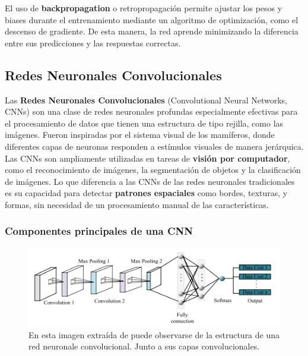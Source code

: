 El uso de \textbf{backpropagation} o retropropagación permite ajustar los pesos y biases durante el entrenamiento
mediante un algoritmo de optimización, como el descenso de gradiente.
De esta manera, la red aprende minimizando la diferencia entre sus predicciones y las respuestas correctas.
\subsection{Redes Neuronales Convolucionales}\label{subsec:redes_neuronales_convolucionales}
Las \textbf{Redes Neuronales Convolucionales} (Convolutional Neural Networks, CNNs) son una clase de redes neuronales
profundas especialmente efectivas para el procesamiento de datos que tienen una estructura de tipo rejilla, como las
imágenes.
Fueron inspiradas por el sistema visual de los mamíferos, donde diferentes capas de neuronas responden a estímulos
visuales de manera jerárquica. \\[2pt]

Las CNNs son ampliamente utilizadas en tareas de \textbf{visión por computador}, como el reconocimiento de imágenes, la
segmentación de objetos y la clasificación de imágenes.
Lo que diferencia a las CNNs de las redes neuronales tradicionales es su capacidad para detectar
\textbf{patrones espaciales} como bordes, texturas, y formas, sin necesidad de un procesamiento manual de las
características.


\subsubsection{Componentes principales de una CNN}\label{subsubsec:componentes_principales_de_una_cnn}

\begin{figure}[htp] \label{fig:convolution_layer}
    \begin{center}
        \includegraphics[width=1\textwidth]{imagenes/convolution_layer.png}
    \end{center}
    \caption[Puntos globales y locales]{En esta imagen extraída de
    \cite{A review of convolutional neural networks in computer vision} puede observarse de la estructura de una red
    neuronale convolucional. Junto a sus capas convolucionales. }
\end{figure}


